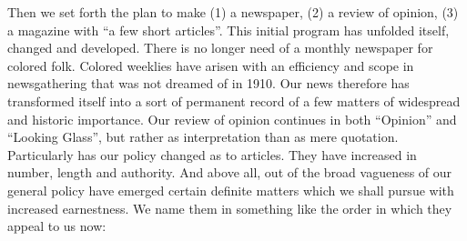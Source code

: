 \documentclass[letterpaper,10pt,english]{jupyterBook}
\begin{document}
\sphinxAtStartPar
Then we set forth the plan to make  (1) a newspaper, (2) a review of opinion, (3) a magazine with “a few short articles”. This initial program has unfolded itself, changed and developed. There is no longer need of a monthly newspaper for colored folk. Colored weeklies have arisen with an efficiency and scope in news\sphinxhyphen{}gathering that was not dreamed of in 1910. Our news therefore has transformed itself into a sort of permanent record of a few matters of widespread and historic importance. Our review of opinion continues in both “Opinion” and “Looking Glass”, but rather as interpretation than as mere quotation. Particularly has our policy changed as to articles. They have increased in number, length and authority. And above all, out of the broad vagueness of our general policy have emerged certain definite matters which we shall pursue with increased earnestness. We name them in something like the order in which they appeal to us now:
\end{document}
